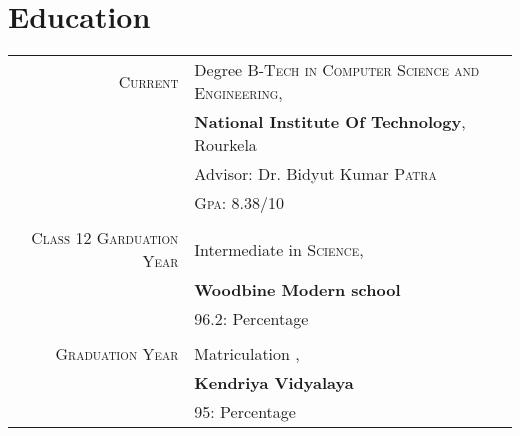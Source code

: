 \documentclass[a4paper,10pt]{article}
\begin{document}
\section{Education}
\begin{tabular}{rl}	
 \textsc{Current} & Degree \textsc{B-Tech in Computer Science and Engineering},\\ & \textbf{National Institute Of Technology}, Rourkela\\
& \small Advisor: Dr. Bidyut Kumar \textsc{Patra}\\
&\normalsize \textsc{Gpa}: 8.38/10 \\ \\
\textsc{Class 12 Garduation Year} & Intermediate in \textsc{Science},\\ & \textbf{Woodbine Modern school}\\
&\normalsize \textsc{96.2}: Percentage
\\ \\
\textsc{Graduation Year} & Matriculation ,\\ & \textbf{Kendriya Vidyalaya}\\
&\normalsize \textsc{95}: Percentage
\end{tabular}

\end{document}
